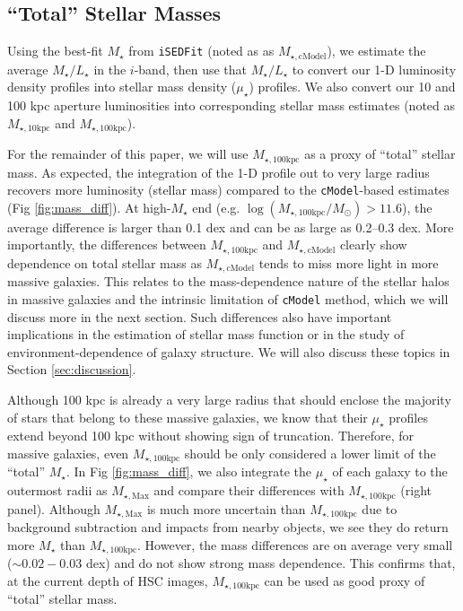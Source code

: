 \documentclass[a4paper,fleqn,usenatbib]{mnras}
\def\cmodel{\texttt{cModel}}
\def\mstar{{$M_{\star}$}}
\def\minn{{$M_{\star,10\mathrm{kpc}}$}}
\def\mtot{{$M_{\star,100\mathrm{kpc}}$}}
\def\mmax{{$M_{\star,\mathrm{Max}}$}}
\def\mcmodel{{$M_{\star,\mathrm{cModel}}$}}
\def\logmtot{{$\log (M_{\star,100\mathrm{kpc}}/M_{\odot})$}}
\def\m2l{{$M_{\star}/L_{\star}$}}
\def\mden{{$\mu_{\star}$}}
\begin{document}

\subsection{``Total'' Stellar Masses}
    \label{ssec:mtotal}
    
    Using the best-fit \mstar{} from \texttt{iSEDFit} (noted as as \mcmodel{}), 
    we estimate the average \m2l{} in the $i$-band, then use that \m2l{} to convert 
    our 1-D luminosity density profiles into stellar mass density (\mden{}) profiles. 
    We also convert our 10 and 100 kpc aperture luminosities into corresponding stellar 
    mass estimates (noted as \minn{} and \mtot{}).

    For the remainder of this paper, we will use \mtot{} as a proxy of ``total'' 
    stellar mass. 
    As expected, the integration of the 1-D profile out to very large radius recovers 
    more luminosity (stellar mass) compared to the \cmodel{}-based estimates 
    (Fig \ref{fig:mass_diff}).
    At high-\mstar{} end (e.g. \logmtot{}$>11.6$), the average difference is larger 
    than 0.1 dex and can be as large as 0.2--0.3 dex.  
    More importantly, the differences between \mtot{} and \mcmodel{} clearly show 
    dependence on total stellar mass as \mcmodel{} tends to miss more light in 
    more massive galaxies.  
    This relates to the mass-dependence nature of the stellar halos in massive 
    galaxies and the intrinsic limitation of \cmodel{} method, which we will discuss
    more in the next section.
    Such differences also have important implications in the estimation of stellar 
    mass function or in the study of environment-dependence of galaxy structure.  
    We will also discuss these topics in Section \ref{sec:discussion}.
    
    Although 100 kpc is already a very large radius that should enclose the majority 
    of stars that belong to these massive galaxies, we know that their \mden{} 
    profiles extend beyond 100 kpc without showing sign of truncation. 
    Therefore, for massive galaxies, even \mtot{} should be only considered a lower
    limit of the ``total'' \mstar{}. 
    In Fig \ref{fig:mass_diff}, we also integrate the \mden{} of each galaxy to the 
    outermost radii as \mmax{} and compare their differences with \mtot{} 
    (right panel).  
    Although \mmax{} is much more uncertain than \mtot{} due to background subtraction
    and impacts from nearby objects, we see they do return more \mstar{} than \mtot{}. 
    However, the mass differences are on average very small ($\sim0.02-0.03$ dex) and 
    do not show strong mass dependence.  
    This confirms that, at the current depth of HSC images, \mtot{} can be used as 
    good proxy of ``total'' stellar mass.   
    
\end{document}
